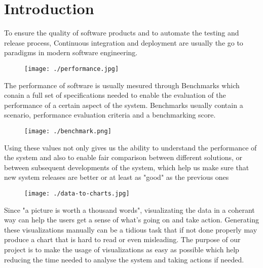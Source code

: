\section{Introduction}
\begin{sloppypar}
To ensure the quality of software products and to automate the testing and release process, 
Continuous integration and deployment are usually the go to paradigms in modern software engineering.
\begin{figure}[ht]
    \begin{center}
        \texttt{[image: ./performance.jpg]}
    \end{center}
    
    \caption{}
\end{figure}

The performance of software is usually mesured through Benchmarks which conain a full set of specifications needed to enable the evaluation of the performance of a certain aspect of the system.
Benchmarks usually contain a scenario, performance evaluation criteria and a benchmarking score. 
\clearpage
\begin{figure}[ht]
    \begin{center}
        \texttt{[image: ./benchmark.png]}
    \end{center}
    \caption{}
\end{figure}

Using these values not only gives us the ability to understand the performance of the system and also to enable fair comparison between different solutions, 
or between subsequent developments of the system, which help us make sure that new system releases are better or at least as "good" as the previous ones

\begin{figure}[ht]
    \begin{center}
        \texttt{[image: ./data-to-charts.jpg]}
    \end{center}
    \caption{}
\end{figure}

Since "a picture is worth a thousand words", visualizating the data in a coherant way can help the users get a sense of what's going on and take action.
Generating these visualizations manually can be a tidious task that if not done properly may produce a chart that is hard to read or even misleading.
The purpose of our project is to make the usage of visualizations as easy as possible which help reducing the time needed to analyse the system and taking actions if needed.

\end{sloppypar}
